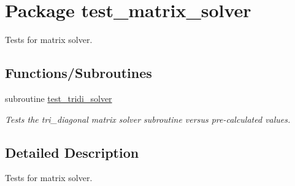 \hypertarget{a00091}{
\section{Package test\_\-matrix\_\-solver}
\label{a00091}
}
Tests for matrix solver.  


\subsection*{Functions/Subroutines}
\begin{CompactItemize}
\item 
\hypertarget{a00091_33a0d904664a191d2fd2d0c433049808}{
subroutine \hyperlink{a00091_33a0d904664a191d2fd2d0c433049808}{test\_\-tridi\_\-solver}}
\label{a00091_33a0d904664a191d2fd2d0c433049808}

\begin{CompactList}\small\item\em Tests the tri\_\-diagonal matrix solver subroutine versus pre-calculated values. \item\end{CompactList}\end{CompactItemize}


\subsection{Detailed Description}
Tests for matrix solver. 

